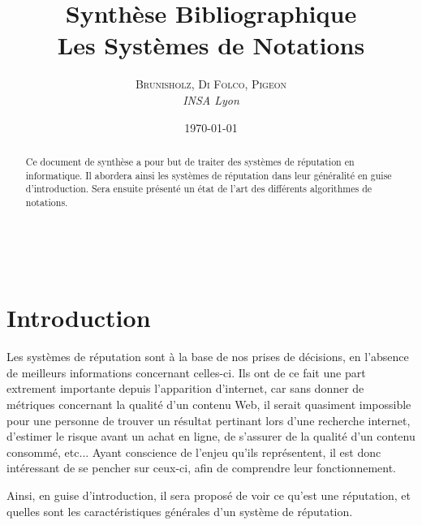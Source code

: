 \documentclass[a4paper, 11pt]{article} %
\title{\textbf{Synthèse Bibliographique}\\ %
Les Systèmes de Notations} %
\author{\textsc{Brunisholz, Di Folco, Pigeon} %
\\{\textit{INSA Lyon}}} %
\date{\today} %
\makeatletter
\renewcommand{\maketitle}{ %
\begin{flushright} %
{\LARGE\@title} %

\vspace{50pt} %

{\large\@author} %
\\\@date %

\vspace{40pt} %
\end{flushright}
}
\makeatother
\begin{document}
\maketitle %



\begin{abstract}
	Ce document de synthèse a pour but de traiter des systèmes de réputation en informatique.
	Il abordera ainsi les systèmes de réputation dans leur généralité en guise d'introduction.
	Sera ensuite présenté un état de l'art des différents algorithmes de notations.
\end{abstract}


\vspace{30pt} %


\section{Introduction}
Les systèmes de réputation sont à la base de nos prises de décisions, en l'absence de meilleurs informations concernant celles-ci.
Ils ont de ce fait une part extrement importante depuis l'apparition d'internet, car sans donner de métriques concernant la qualité d'un contenu Web,
il serait quasiment impossible pour une personne de trouver un résultat pertinant lors d'une recherche internet, d'estimer le risque avant un achat en ligne,
de s'assurer de la qualité d'un contenu consommé, etc...
Ayant conscience de l'enjeu qu'ils représentent, il est donc intéressant de se pencher sur ceux-ci, afin de comprendre leur fonctionnement.

Ainsi, en guise d'introduction, il sera proposé de voir ce qu'est une réputation, et quelles sont les caractéristiques générales d'un système de réputation.
\end{document}
